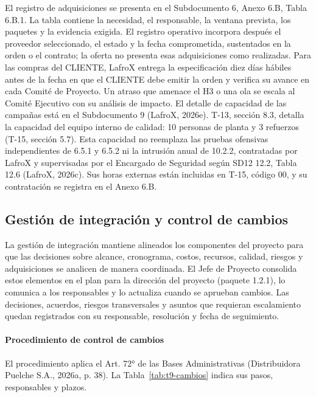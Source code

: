 \documentclass[carta,firma,final]{lafrox}
\begin{document}
El registro de adquisiciones se presenta en el Subdocumento 6, Anexo 6.B, Tabla 6.B.1. La tabla contiene la necesidad, el responsable, la ventana prevista, los paquetes y la evidencia exigida. El registro operativo incorpora después el proveedor seleccionado, el estado y la fecha comprometida, sustentados en la orden o el contrato; la oferta no presenta esas adquisiciones como realizadas. Para las compras del CLIENTE, LafroX entrega la especificación diez días hábiles antes de la fecha en que el CLIENTE debe emitir la orden y verifica su avance en cada Comité de Proyecto. Un atraso que amenace el H3 o una ola se escala al Comité Ejecutivo con su análisis de impacto. El detalle de capacidad de las campañas está en el Subdocumento 9 (LafroX, 2026e). T-13, sección 8.3, detalla la capacidad del equipo interno de calidad: 10 personas de planta y 3 refuerzos (T-15, sección 5.7). Esta capacidad no reemplaza las pruebas ofensivas independientes de 6.5.1 y 6.5.2 ni la intrusión anual de 10.2.2, contratadas por LafroX y supervisadas por el Encargado de Seguridad según SD12 12.2, Tabla 12.6 (LafroX, 2026c). Sus horas externas están incluidas en T-15, código 00, y su contratación se registra en el Anexo 6.B.

\subsection{Gestión de integración y control de cambios}

La gestión de integración mantiene alineados los componentes del proyecto para que las decisiones sobre alcance, cronograma, costos, recursos, calidad, riesgos y adquisiciones se analicen de manera coordinada. El Jefe de Proyecto consolida estos elementos en el plan para la dirección del proyecto (paquete 1.2.1), lo comunica a los responsables y lo actualiza cuando se aprueban cambios. Las decisiones, acuerdos, riesgos transversales y asuntos que requieran escalamiento quedan registrados con su responsable, resolución y fecha de seguimiento.

\paragraph{Procedimiento de control de cambios}
El procedimiento aplica el Art. 72° de las Bases Administrativas (Distribuidora Puelche S.A., 2026a, p. 38). La Tabla~\ref{tab:t9-cambios} indica sus pasos, responsables y plazos.
\end{document}
